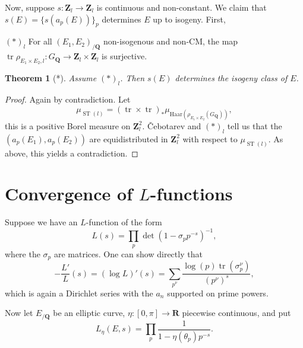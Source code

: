 \documentclass{article}
\DeclareMathOperator{\ST}{ST}
\DeclareMathOperator{\trace}{tr}
\newcommand{\bQ}{\mathbf{Q}}
\newcommand{\bR}{\mathbf{R}}
\newcommand{\bZ}{\mathbf{Z}}
\newtheorem{theorem}{Theorem}
\numberwithin{theorem}{section}
\begin{document}
Now, suppose $s\colon \bZ_l\to \bZ_l$ is continuous and non-constant. We claim 
that $s(E) = \{s(a_p(E))\}_p$ determines $E$ up to isogeny. First, 

$(*)_l$ For all $(E_1,E_2)_{/\bQ}$ non-isogenous and non-CM, the map 
$\trace \rho_{E_1\times E_2,l}\colon G_\bQ\to \bZ_l\times \bZ_l$ is surjective. 

\begin{theorem}[*]
Assume $(\ast)_l$. Then $s(E)$ determines the isogeny class of $E$. 
\end{theorem}
\begin{proof}
Again by contradiction. Let 
\[
	\mu_{\ST(l)} = (\trace\times\trace)_\ast \mu_{\mathrm{Haar}(\rho_{E_1\times E_2}(G_\bQ))} ,
\]
this is a positive Borel measure on $\bZ_l^2$. \v{C}ebotarev and $(\ast)_l$ 
tell us that the $(a_p(E_1),a_p(E_2))$ are equidistributed in 
$\bZ_l^2$ with respect to $\mu_{\ST(l)}$. As above, this yields a 
contradiction. 
\end{proof}





\section{Convergence of \texorpdfstring{$L$}{L}-functions}

Suppose we have an $L$-function of the form 
\[
	L(s) = \prod_p \det(1-\sigma_p p^{-s})^{-1} ,
\]
where the $\sigma_p$ are matrices. One can show directly that 
\[
	-\frac{L'}{L}(s) = (\log L)'(s) = \sum_{p^\nu} \frac{\log(p)\trace(\sigma_p^\nu)}{(p^\nu)^s} ,
\]
which is again a Dirichlet series with the $a_n$ supported on prime powers. 

Now let $E_{/\bQ}$ be an elliptic curve, $\eta\colon [0,\pi]\to \bR$ 
piecewise continuous, and put 
\[
	L_\eta(E,s) = \prod_p \frac{1}{1-\eta(\theta_p) p^{-s}} .
\]
\end{document}
